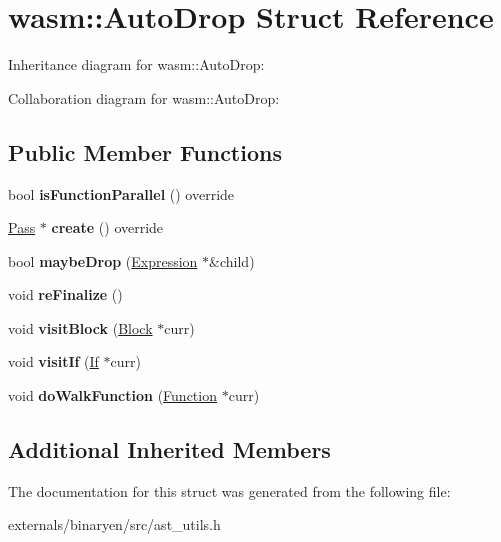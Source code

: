 \hypertarget{structwasm_1_1_auto_drop}{}\section{wasm\+:\+:Auto\+Drop Struct Reference}
\label{structwasm_1_1_auto_drop}


Inheritance diagram for wasm\+:\+:Auto\+Drop\+:


Collaboration diagram for wasm\+:\+:Auto\+Drop\+:
\subsection*{Public Member Functions}
\begin{DoxyCompactItemize}
\item 
\mbox{\label{structwasm_1_1_auto_drop_ad3c40b494c3271e421e39d50dc6eb9fa}} 
bool {\bfseries is\+Function\+Parallel} () override
\item 
\mbox{\label{structwasm_1_1_auto_drop_a16fabd523ff4e0405c3c50bb8b448d6f}} 
\mbox{\hyperlink{classwasm_1_1_pass}{Pass}} $\ast$ {\bfseries create} () override
\item 
\mbox{\label{structwasm_1_1_auto_drop_a37a0632d77d99b9993a13fefdf39ffd4}} 
bool {\bfseries maybe\+Drop} (\mbox{\hyperlink{classwasm_1_1_expression}{Expression}} $\ast$\&child)
\item 
\mbox{\label{structwasm_1_1_auto_drop_a8d9a46e9466c7d22d8d19e8481dde942}} 
void {\bfseries re\+Finalize} ()
\item 
\mbox{\label{structwasm_1_1_auto_drop_a499ce54d2ac83cf30f73097853fa7758}} 
void {\bfseries visit\+Block} (\mbox{\hyperlink{classwasm_1_1_block}{Block}} $\ast$curr)
\item 
\mbox{\label{structwasm_1_1_auto_drop_afa4c41398e41a9713871b51bec5e6e2a}} 
void {\bfseries visit\+If} (\mbox{\hyperlink{classwasm_1_1_if}{If}} $\ast$curr)
\item 
\mbox{\label{structwasm_1_1_auto_drop_af77a5e0e1857cf687a8020abb7079ff7}} 
void {\bfseries do\+Walk\+Function} (\mbox{\hyperlink{classwasm_1_1_function}{Function}} $\ast$curr)
\end{DoxyCompactItemize}
\subsection*{Additional Inherited Members}


The documentation for this struct was generated from the following file\+:\begin{DoxyCompactItemize}
\item 
externals/binaryen/src/ast\+\_\+utils.\+h\end{DoxyCompactItemize}
